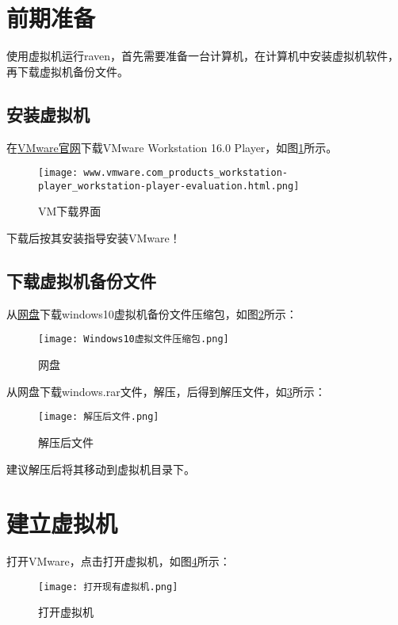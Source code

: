 \section{前期准备}
使用虚拟机运行raven，首先需要准备一台计算机，在计算机中安装虚拟机软件，再下载虚拟机备份文件。
\subsection{安装虚拟机}
在\href{https://www.vmware.com/products/workstation-player/workstation-player-evaluation.html}{VMware官网}下载VMware Workstation 16.0 Player，如图\ref{VM下载界面}所示。
\begin{figure}[h]
    \centering
    \texttt{[image: www.vmware.com\_products\_workstation-player\_workstation-player-evaluation.html.png]}
    \caption{VM下载界面}
    \label{VM下载界面}
\end{figure}

下载后按其安装指导安装VMware！

\subsection{下载虚拟机备份文件}
从\href{https://hrbeueducn-my.sharepoint.com/:u:/g/personal/6ming_hrbeu_edu_cn/EeUGCVn3UFVIooQBe_4KA84B91BWppg__eVfWB9nZlAKkA?e=g2146y}{网盘}下载windows10虚拟机备份文件压缩包，如图\ref{网盘}所示：
\begin{figure}[ht]
    \centering
    \texttt{[image: Windows10虚拟文件压缩包.png]}
    \caption{网盘}
    \label{网盘}
\end{figure}

从网盘下载windows.rar文件，解压，后得到解压文件，如\ref{解压后文件}所示：
\begin{figure}[ht]
    \centering
    \texttt{[image: 解压后文件.png]}
    \caption{解压后文件}
    \label{解压后文件}
\end{figure}

建议解压后将其移动到虚拟机目录下。

\section{建立虚拟机}
打开VMware，点击打开虚拟机，如图\ref{打开虚拟机}所示：
\begin{figure}[ht]
    \centering
    \texttt{[image: 打开现有虚拟机.png]}
    \caption{打开虚拟机}
    \label{打开虚拟机}
\end{figure}

